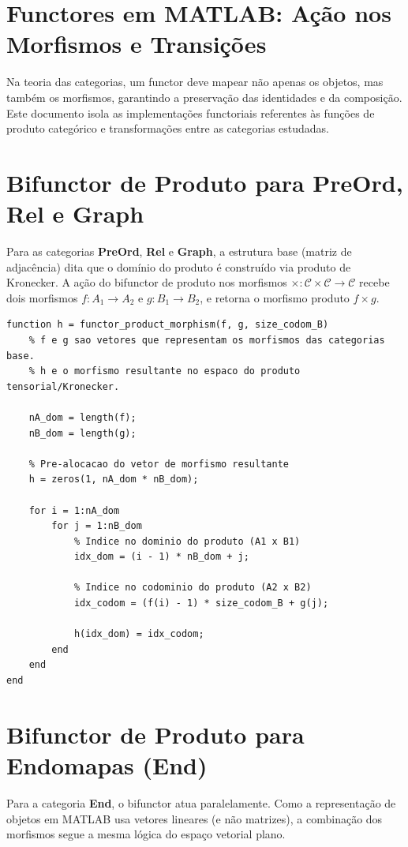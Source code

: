\documentclass[11pt,a4paper]{article}
\begin{document}
\section*{Functores em MATLAB: Ação nos Morfismos e Transições}

Na teoria das categorias, um functor deve mapear não apenas os objetos, mas também os morfismos, garantindo a preservação das identidades e da composição. Este documento isola as implementações functoriais referentes às funções de produto categórico e transformações entre as categorias estudadas.

\section{Bifunctor de Produto para PreOrd, Rel e Graph}
Para as categorias \textbf{PreOrd}, \textbf{Rel} e \textbf{Graph}, a estrutura base (matriz de adjacência) dita que o domínio do produto é construído via produto de Kronecker. A ação do bifunctor de produto nos morfismos $\times: \mathcal{C} \times \mathcal{C} \to \mathcal{C}$ recebe dois morfismos $f: A_1 \to A_2$ e $g: B_1 \to B_2$, e retorna o morfismo produto $f \times g$.

\begin{lstlisting}[caption={Ação do Bifunctor de Produto nos Morfismos (PreOrd, Rel, Graph)}]
function h = functor_product_morphism(f, g, size_codom_B)
    % f e g sao vetores que representam os morfismos das categorias base.
    % h e o morfismo resultante no espaco do produto tensorial/Kronecker.
    
    nA_dom = length(f);
    nB_dom = length(g);
    
    % Pre-alocacao do vetor de morfismo resultante
    h = zeros(1, nA_dom * nB_dom);
    
    for i = 1:nA_dom
        for j = 1:nB_dom
            % Indice no dominio do produto (A1 x B1)
            idx_dom = (i - 1) * nB_dom + j;
            
            % Indice no codominio do produto (A2 x B2)
            idx_codom = (f(i) - 1) * size_codom_B + g(j);
            
            h(idx_dom) = idx_codom;
        end
    end
end
\end{lstlisting}

\section{Bifunctor de Produto para Endomapas (End)}
Para a categoria \textbf{End}, o bifunctor atua paralelamente. Como a representação de objetos em MATLAB usa vetores lineares (e não matrizes), a combinação dos morfismos segue a mesma lógica do espaço vetorial plano.
\end{document}
